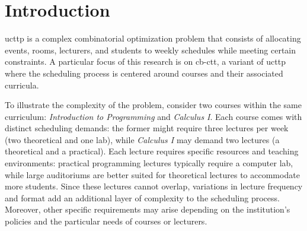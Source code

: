 
\chapter{Introduction}


\label{Introduction}


\ac{ucttp} is a complex combinatorial optimization problem that consists of allocating events, rooms, lecturers, and students to weekly schedules while meeting certain constraints. A particular focus of this research is on \ac{cb-ctt}, a variant of \ac{ucttp} where the scheduling process is centered around courses and their associated curricula. 

To illustrate the complexity of the problem, consider two courses within the same curriculum: \textit{Introduction to Programming} and \textit{Calculus I}. Each course comes with distinct scheduling demands: the former might require three lectures per week (two theoretical and one lab), while \textit{Calculus I} may demand two lectures (a theoretical and a practical). Each lecture requires specific resources and teaching environments: practical programming lectures typically require a computer lab, while large auditoriums are better suited for theoretical lectures to accommodate more students. Since these lectures cannot overlap, variations in lecture frequency and format add an additional layer of complexity to the scheduling process. %
Moreover, other specific requirements may arise depending on the institution’s policies and the particular needs of courses or lecturers.

